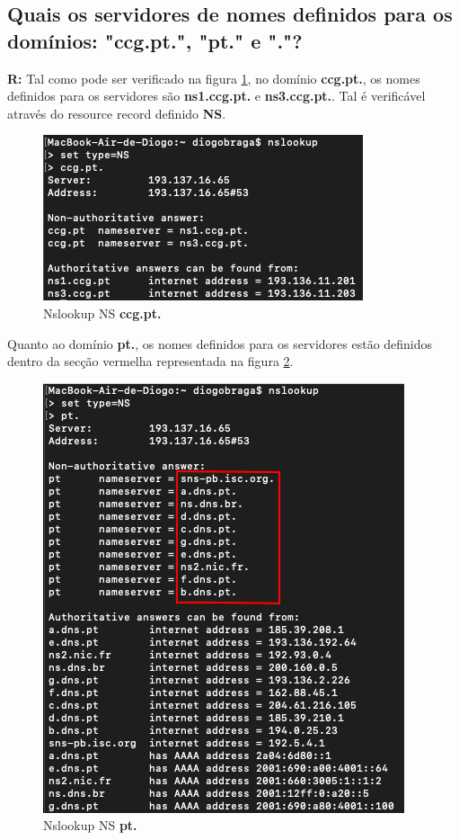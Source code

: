 \documentclass{llncs}
\begin{document}
\subsection{\textbf{Quais os servidores de nomes definidos para os domínios: "ccg.pt.", "pt." e "."?}}
\textbf{R:} Tal como pode ser verificado na figura \ref{fig:31}, no domínio \textbf{ccg.pt.}, os nomes definidos para os servidores são \textbf{ns1.ccg.pt.} e \textbf{ns3.ccg.pt.}. Tal é verificável através do resource record definido \textbf{NS}.

\begin{figure}[H]
\begin{center}
\includegraphics[scale=0.6]{3_1.png}
\end{center}
\caption{\label{fig:31}Nslookup NS \textbf{ccg.pt.}}
\end{figure}

Quanto ao domínio \textbf{pt.}, os nomes definidos para os servidores estão definidos dentro da secção vermelha representada na figura \ref{fig:32}.

\begin{figure}[H]
\begin{center}
\includegraphics[scale=0.6]{3_2.png}
\end{center}
\caption{\label{fig:32}Nslookup NS \textbf{pt.}}
\end{figure}
\end{document}
